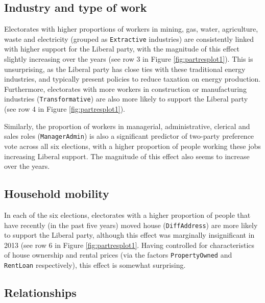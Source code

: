 \documentclass[11pt,a4paper,]{article}
\begin{document}
\hypertarget{industry-and-type-of-work}{%
\subsection*{Industry and type of work}\label{industry-and-type-of-work}}

Electorates with higher proportions of workers in mining, gas, water, agriculture, waste and electricity (grouped as \texttt{Extractive} industries) are consistently linked with higher support for the Liberal party, with the magnitude of this effect slightly increasing over the years (see row 3 in Figure \ref{fig:partresplot1}). This is unsurprising, as the Liberal party has close ties with these traditional energy industries, and typically present policies to reduce taxation on energy production. Furthermore, electorates with more workers in construction or manufacturing industries (\texttt{Transformative}) are also more likely to support the Liberal party (see row 4 in Figure \ref{fig:partresplot1}).

Similarly, the proportion of workers in managerial, administrative, clerical and sales roles (\texttt{ManagerAdmin}) is also a significant predictor of two-party preference vote across all six elections, with a higher proportion of people working these jobs increasing Liberal support. The magnitude of this effect also seems to increase over the years.

\hypertarget{household-mobility}{%
\subsection*{Household mobility}\label{household-mobility}}

In each of the six elections, electorates with a higher proportion of people that have recently (in the past five years) moved house (\texttt{DiffAddress}) are more likely to support the Liberal party, although this effect was marginally insignificant in 2013 (see row 6 in Figure \ref{fig:partresplot1}. Having controlled for characteristics of house ownership and rental prices (via the factors \texttt{PropertyOwned} and \texttt{RentLoan} respectively), this effect is somewhat surprising.

\hypertarget{relationships}{%
\subsection*{Relationships}\label{relationships}}
\end{document}
